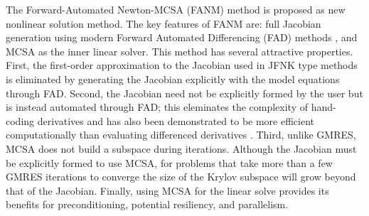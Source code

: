 The Forward-Automated Newton-MCSA (FANM) method is proposed as new
nonlinear solution method. The key features of FANM are: full Jacobian
generation using modern Forward Automated Differencing (FAD) methods
\citep{bartlett_2006}, and MCSA as the inner linear solver. This method
has several attractive properties. First, the first-order
approximation to the Jacobian used in JFNK type methods is eliminated
by generating the Jacobian explicitly with the model equations through
FAD. Second, the Jacobian need not be explicitly formed by the user
but is instead automated through FAD; this eleminates the complexity
of hand-coding derivatives and has also been demonstrated to be more
efficient computationally than evaluating differenced derivatives
\citep{bartlett_2006}. Third, unlike GMRES, MCSA does not build a
subspace during iterations. Although the Jacobian must be explicitly
formed to use MCSA, for problems that take more than a few GMRES
iterations to converge the size of the Krylov subspace will grow
beyond that of the Jacobian. Finally, using MCSA for the linear solve
provides its benefits for preconditioning, potential resiliency, and
parallelism.
